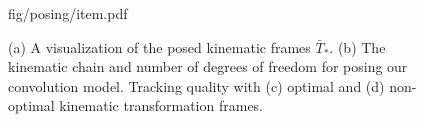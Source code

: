 \begin{figure}[t!]
\centering
\begin{overpic} 
[width=\linewidth]
{fig/posing/item.pdf}
\end{overpic}
\caption{
% 
% 
(a) A visualization of the posed kinematic frames ${\bar{T}}_*$.
(b) The kinematic chain and number of degrees of freedom for posing our convolution model.
Tracking quality with (c) optimal and (d) non-optimal kinematic transformation frames. 
% 
% 
}
\label{fig:posing}
\end{figure}